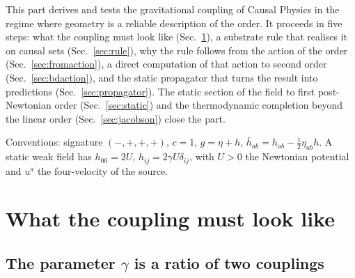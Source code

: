 
This part derives and tests the gravitational coupling of Causal Physics in the regime where
geometry is a reliable description of the order. It proceeds in five steps: what the coupling must
look like (Sec.~\ref{sec:tensor}), a substrate rule that realises it on causal sets
(Sec.~\ref{sec:rule}), why the rule follows from the action of the order (Sec.~\ref{sec:fromaction}),
a direct computation of that action to second order (Sec.~\ref{sec:bdaction}), and the static
propagator that turns the result into predictions (Sec.~\ref{sec:propagator}). The static section of
the field to first post-Newtonian order (Sec.~\ref{sec:static}) and the thermodynamic completion
beyond the linear order (Sec.~\ref{sec:jacobson}) close the part.

Conventions: signature $(-,+,+,+)$, $c=1$, $g=\eta+h$, $\bar h_{ab}=h_{ab}-\tfrac12\eta_{ab}h$. A static
weak field has $h_{00}=2U$, $h_{ij}=2\gamma U\delta_{ij}$, with $U>0$ the Newtonian potential and $u^a$
the four-velocity of the source.

\section{What the coupling must look like}\label{sec:tensor}

\subsection{The parameter \texorpdfstring{$\gamma$}{gamma} is a ratio of two couplings}

